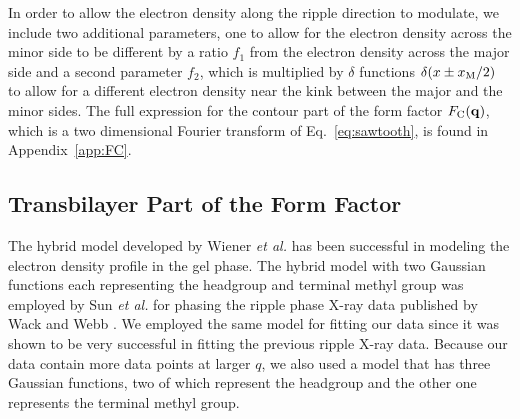In order to allow the electron density along the ripple direction to 
modulate, we include two additional parameters, one to allow for the electron
density across the minor side to be different by a ratio $f_1$ from the 
electron density across the major side and a second parameter $f_2$, which
is multiplied by $\delta$ functions $\delta(x \pm x_\textrm{M}/2)$ to allow for 
a different electron density near the kink between the major and the minor
sides. The full expression for the contour part of the form factor $F_\mathrm{C}(\mathbf{q})$,
which is a two dimensional Fourier transform of Eq.~\ref{eq:sawtooth},
is found in Appendix~\ref{app:FC}.

\subsection{Transbilayer Part of the Form Factor}\label{sec:transbilayer}
The hybrid model developed by Wiener \textit{et al.} \cite{ref:Wiener89} has
been successful in modeling the electron density profile in the gel phase.
The hybrid model with two Gaussian functions each representing the headgroup and
terminal methyl group was employed by Sun 
\textit{et al.} \cite{ref:Sun96}
for phasing the ripple phase X-ray data published by Wack and Webb \cite{ref:Wack89}.
We employed the same model for fitting our data 
since it was shown to be very successful in fitting the previous ripple X-ray data.
Because our data contain more data points at larger $q$, we also used
a model that has three  Gaussian functions, two of which represent the headgroup 
and the other one represents the terminal methyl group. 

